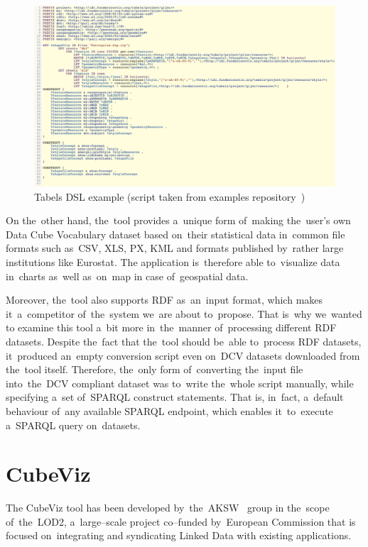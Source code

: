 \begin{figure}
	\centering
	\includegraphics[width=140mm]{img/tabels.png}
	\caption{Tabels DSL example (script taken from examples repository~\cite{tabels-web})}
	\label{fig:tabels}
\end{figure}

On the~other hand, the~tool provides a~unique form of~making the~user's own Data Cube 
Vocabulary dataset based on~their statistical data in~common file formats such as~CSV, XLS, PX, KML and formats published by~rather large institutions like Eurostat. 
The application is~therefore able to~visualize data in~charts as~well as~on~map 
in case of~geospatial data.

Moreover, the~tool also supports RDF as~an~input format, which makes it~a~competitor of~the~system we~are about to~propose. That is~why we~wanted
to examine this tool a~bit more in~the~manner of~processing different RDF 
datasets. Despite the~fact that the~tool should be~able to~process RDF 
datasets, it~produced an~empty conversion script even on~DCV datasets downloaded 
from the~tool itself. Therefore, the~only form of~converting the~input file into~the~DCV compliant dataset was to~write the~whole script manually, while 
specifying a~set of~SPARQL construct statements. That is, in~fact, a~default 
behaviour of~any available SPARQL endpoint, which enables it~to~execute a~SPARQL 
query on~datasets.

\section{CubeViz}
\label{cubeviz}
The CubeViz tool has been developed by~the~AKSW~\cite{aksw} group
in the~scope of~the~LOD2,
a~large--scale project co--funded by~European Commission that is
focused on~integrating and syndicating Linked Data with existing applications.

